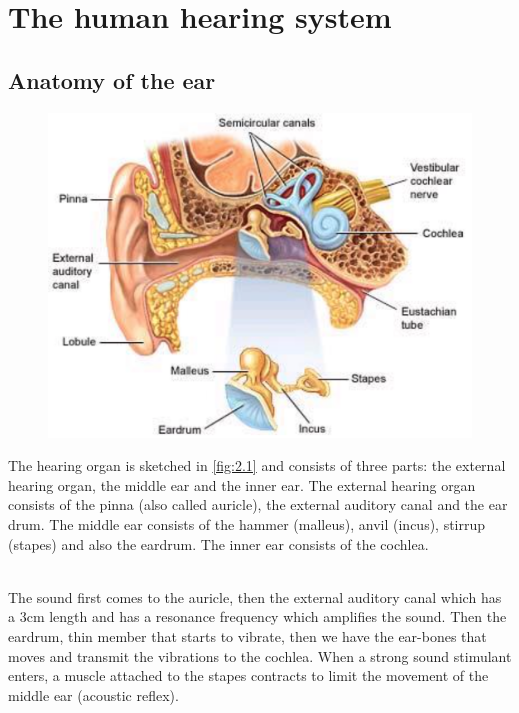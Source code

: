 
\chapter{The human hearing system}
\section{Anatomy of the ear}
	\begin{figure}
	\vspace{-5mm}
	\includegraphics[scale=0.2]{acoustics/ch2/1}
	\label{fig:2.1}
	\end{figure}
	The hearing organ is sketched in \autoref{fig:2.1} and consists of three parts: the external hearing organ, the middle ear and the inner ear. The external hearing organ consists of the pinna (also called auricle), the external auditory canal and the ear drum. The middle ear consists of the hammer (malleus), anvil (incus), stirrup (stapes) and also the eardrum. The inner ear consists of the cochlea. 
	
	\ \\ The sound first comes to the auricle, then the external auditory canal which  has a 3cm length and has a resonance frequency which amplifies the sound. Then the eardrum, thin member that starts to vibrate, then we have the ear-bones that moves and transmit the vibrations to the cochlea. When a strong sound stimulant enters, a muscle attached to the stapes contracts to limit the movement of the middle ear (acoustic reflex). 
	
